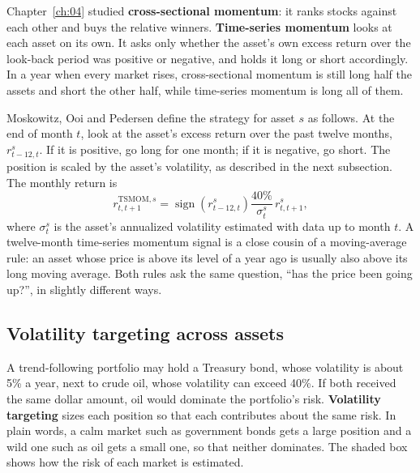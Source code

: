Chapter~\ref{ch:04} studied \textbf{cross-sectional momentum}: it ranks stocks against each other and buys the relative winners. \textbf{Time-series momentum} looks at each asset on its own. It asks only whether the asset's own excess return over the look-back period was positive or negative, and holds it long or short accordingly. In a year when every market rises, cross-sectional momentum is still long half the assets and short the other half, while time-series momentum is long all of them.

Moskowitz, Ooi and Pedersen define the strategy for asset $s$ as follows. At the end of month $t$, look at the asset's excess return over the past twelve months, $r^s_{t-12,t}$. If it is positive, go long for one month; if it is negative, go short. The position is scaled by the asset's volatility, as described in the next subsection. The monthly return is
\begin{equation}
  r^{\text{TSMOM},s}_{t,t+1} = \operatorname{sign}\left(r^s_{t-12,t}\right) \frac{40\%}{\sigma^s_t}\, r^s_{t,t+1},
  \label{eq:08-tsmom}
\end{equation}
where $\sigma^s_t$ is the asset's annualized volatility estimated with data up to month $t$. A twelve-month time-series momentum signal is a close cousin of a moving-average rule: an asset whose price is above its level of a year ago is usually also above its long moving average. Both rules ask the same question, ``has the price been going up?'', in slightly different ways.

\subsection{Volatility targeting across assets}

A trend-following portfolio may hold a Treasury bond, whose volatility is about 5\% a year, next to crude oil, whose volatility can exceed 40\%. If both received the same dollar amount, oil would dominate the portfolio's risk. \textbf{Volatility targeting} sizes each position so that each contributes about the same risk. In plain words, a calm market such as government bonds gets a large position and a wild one such as oil gets a small one, so that neither dominates. The shaded box shows how the risk of each market is estimated.

